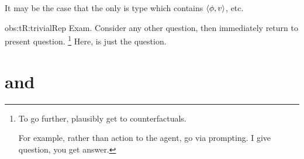 \begin{note}
  \begin{observation}%
    \label{obs:tR:trivialRep}%
    It may be the case that the only \rotoc{} is type which contains \(\langle \phi, v \rangle\), etc.
  \end{observation}

  \begin{motivation}{obs:tR:trivialRep}
    Exam.
    Consider any other question, then immediately return to present question.%
    \footnote{
      To go further, plausibly get to counterfactuals.

      For example, rather than action to the agent, go via prompting.
      I give question, you get answer.
    }
    Here, \tRep{} is just the question.
  \end{motivation}
\end{note}


\section{ and }
\label{cha:typical:tC-fc}

